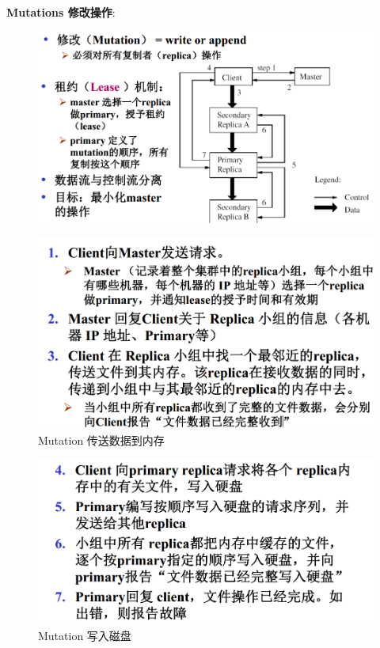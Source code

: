 \documentclass[UTF8,a4paper]{ctexart}
\begin{document}
\textbf{Mutations  修改操作}:
\begin{figure}[H]
  \centering
  \includegraphics[scale = 0.3]{assets/ParallelComputing_6659c.png}
\end{figure}
\begin{figure}[H]
  \centering
  \includegraphics[scale = 0.3]{assets/ParallelComputing_549c1.png}
  \caption{Mutation 传送数据到内存}
\end{figure}
\begin{figure}[H]
  \centering
  \includegraphics[scale = 0.3]{assets/ParallelComputing_529b6.png}
  \caption{Mutation 写入磁盘}
\end{figure}
\end{document}
